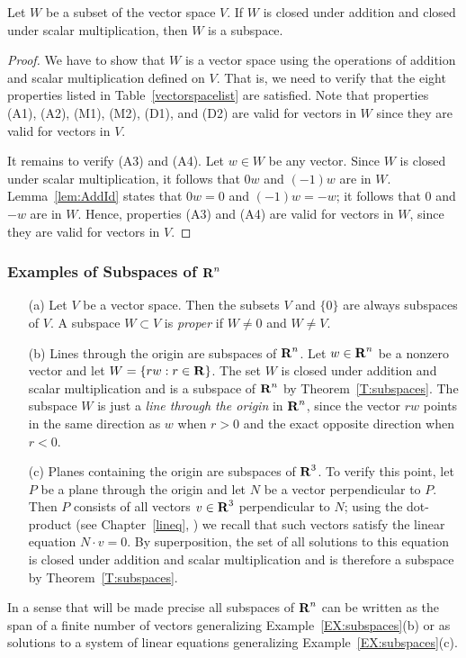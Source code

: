 \documentclass{ximera}
\begin{document}
\begin{thm}  \label{T:subspaces}
Let $W$ be a subset of the vector space $V$. If $W$ is closed under addition 
and closed under scalar multiplication, then $W$ is a subspace.
\end{thm}
\begin{proof}  We have to show that $W$ is a vector space using the operations 
of addition and scalar multiplication defined on $V$.  That is, we need to
verify that the eight properties listed in Table~\ref{vectorspacelist} are 
satisfied.  Note that properties (A1), (A2), (M1), (M2), (D1), and (D2) are 
valid for vectors in $W$ since they are valid for vectors in $V$.

It remains to verify (A3) and (A4).  Let $w\in W$ be any vector.
Since $W$ is closed under scalar multiplication, it follows that
$0w$ and $(-1)w$ are in $W$. Lemma~\ref{lem:AddId} states that
$0w=0$ and $(-1)w=-w$; it follows that $0$ and $-w$ are in $W$.
Hence, properties (A3) and (A4) are valid for vectors in $W$,
since they are valid for vectors in $V$.  \end{proof}

\subsubsection*{Examples of Subspaces of $\mbox{$\bf{R}$}^n$}

\begin{exam}  \label{EX:subspaces}
{\rm
\begin{itemize}
\item[(a)] Let $V$ be a vector space.  Then the subsets $V$ and $\{0\}$ are
always subspaces of $V$.  A subspace $W\subset V$ is {\em proper\/} if
$W\neq 0$ and $W\neq V$. 
\item[(b)] Lines through the origin are subspaces of $\mbox{$\bf{R}$}^n$.  Let $w\in \mbox{$\bf{R}$}^n$
be a nonzero vector and let $W=\{rw:r\in\mbox{$\bf{R}$}\}$.  The set $W$ is closed under
addition and scalar multiplication and is a subspace of $\mbox{$\bf{R}$}^n$ by 
Theorem~\ref{T:subspaces}.
The subspace $W$ is just a {\em line through the origin\/} in $\mbox{$\bf{R}$}^n$, since
the vector $rw$ points in the same direction as $w$ when $r>0$ and the exact
opposite direction when $r<0$.
\item[(c)]  Planes containing the origin are subspaces of $\mbox{$\bf{R}$}^3$.  To verify
this point, let $P$ be a plane through the origin and let $N$ be a vector
perpendicular to $P$.  Then $P$ consists of all vectors
$v\in\mbox{$\bf{R}$}^3$ perpendicular to $N$; using the dot-product (see Chapter~\ref{lineq},
) we recall that such vectors satisfy the linear equation
$N\cdot v = 0$.  By superposition, the set of all
solutions to this equation is closed under addition and scalar multiplication
and is therefore a subspace by Theorem~\ref{T:subspaces}.
\end{itemize}
}
\end{exam}
In a sense that will be made precise all subspaces of $\mbox{$\bf{R}$}^n$ can be written
as the span of a finite number of vectors generalizing
Example~\ref{EX:subspaces}(b) or as solutions to a system of linear equations
generalizing Example~\ref{EX:subspaces}(c).
\end{document}
